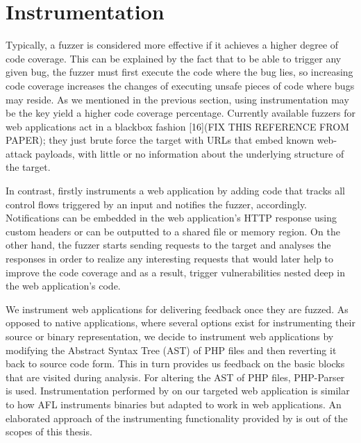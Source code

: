 \section{Instrumentation}
Typically, a fuzzer is considered more effective if it achieves a higher degree of code coverage. This can be explained by the fact that to be able to trigger any given bug, the fuzzer must first execute the code where the bug lies, so increasing code coverage increases the changes of executing unsafe pieces of code where bugs may reside. As we mentioned in the previous section, using instrumentation may be the key yield a higher code coverage percentage.
Currently available fuzzers for web applications act in a blackbox fashion [16](FIX THIS REFERENCE FROM PAPER); they just brute force the target with URLs that embed known web-attack payloads, with little or no information about the underlying structure of the target. 

In contrast, \pname firstly instruments a web application by adding code that tracks all control flows triggered by an input and notifies the fuzzer, accordingly. Notifications can be embedded in the web application's HTTP response using custom headers or can be outputted to a shared file or memory region. On the other hand, the fuzzer starts sending requests to the target and analyses the responses in order to realize any interesting requests that would later help to improve the code coverage and as a result, trigger vulnerabilities nested deep in the web application's code.

We instrument web applications for delivering feedback once
they are fuzzed. As opposed to native applications, where
several options exist for instrumenting their source or binary
representation, we decide to instrument web applications by
modifying the Abstract Syntax Tree (AST) of PHP files and then reverting it back to source code form. This in
turn provides us feedback on the basic blocks that are visited during analysis. For altering the AST of PHP files, PHP-Parser ~\cite{nikicPhpParser} is used. 
Instrumentation performed by \pname on our targeted web application is similar to how AFL instruments binaries but adapted to work in web applications. An elaborated approach of the instrumenting functionality provided by \pname is out of the scopes of this thesis.

